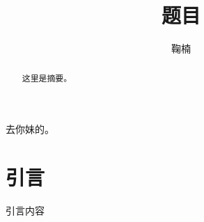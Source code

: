 \documentclass[AcMaster]{BJTU-Thesis}
\author{鞠楠}
\title{题目}
\begin{document}
\frontmatter
\makeInfo

\begin{thanks}
	去你妹的。
\end{thanks}

\begin{abstract}
	这里是摘要。
\end{abstract}


\tableofcontents

\mainmatter
\newpage
\chapter{引言}
引言内容
\end{document}

